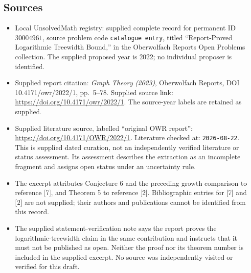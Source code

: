 \documentclass[11pt]{article}
\begin{document}
\subsection{Sources}
\begin{itemize}
\item Local UnsolvedMath registry: supplied complete record for permanent ID \(30004961\), source problem code \texttt{catalogue entry}, titled ``Report-Proved Logarithmic Treewidth Bound,'' in the Oberwolfach Reports Open Problems collection. The supplied proposed year is 2022; no individual proposer is identified.
\item Supplied report citation: \emph{Graph Theory (2023)}, Oberwolfach Reports, DOI 10.4171/owr/2022/1, pp.\ 5--78. Supplied source link: \url{https://doi.org/10.4171/owr/2022/1}. The source-year labels are retained as supplied.
\item Supplied literature source, labelled ``original OWR report'': \url{https://doi.org/10.4171/OWR/2022/1}. Literature checked at: \texttt{2026-08-22}. This is supplied dated curation, not an independently verified literature or status assessment. Its assessment describes the extraction as an incomplete fragment and assigns open status under an uncertainty rule.
\item The excerpt attributes Conjecture 6 and the preceding growth comparison to reference [7], and Theorem 5 to reference [2]. Bibliographic entries for [7] and [2] are not supplied; their authors and publications cannot be identified from this record.
\item The supplied statement-verification note says the report proves the logarithmic-treewidth claim in the same contribution and instructs that it must not be published as open. Neither the proof nor its theorem number is included in the supplied excerpt. No source was independently visited or verified for this draft.
\end{itemize}
\end{document}
